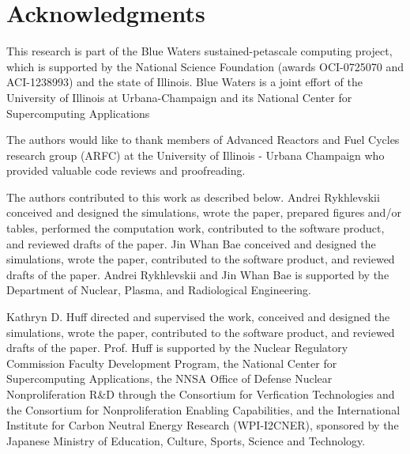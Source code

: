 \section{Acknowledgments}

This research is part of the Blue Waters sustained-petascale computing project, 
which is supported by the National Science Foundation (awards OCI-0725070 and 
ACI-1238993) and the state of Illinois. Blue Waters is a joint effort of the 
University of Illinois at Urbana-Champaign and its National Center for 
Supercomputing Applications 

The authors would like to thank  members of Advanced Reactors and Fuel Cycles
research group (ARFC) at the University of Illinois - Urbana Champaign who 
provided valuable code reviews and proofreading.

The authors contributed to this work as described below.  Andrei Rykhlevskii 
conceived and designed the simulations, wrote the paper, prepared figures 
and/or tables, performed the computation work, contributed to the software 
product, and reviewed drafts of the paper. Jin Whan Bae conceived and designed 
the simulations, wrote the paper, contributed to the software 
product, and reviewed drafts of the paper. Andrei Rykhlevskii and Jin Whan Bae 
is supported by the Department of Nuclear, Plasma, and Radiological Engineering.

Kathryn D. Huff directed and 
supervised the work, conceived and designed the simulations, wrote the paper, 
contributed to the software product, and reviewed drafts of the paper.  Prof. 
Huff is supported by the Nuclear Regulatory Commission Faculty Development 
Program, the National Center for Supercomputing Applications, the NNSA Office 
of Defense Nuclear Nonproliferation R\&D through the Consortium for Verfication 
Technologies and the Consortium for Nonproliferation Enabling Capabilities, and 
the International Institute for Carbon Neutral Energy Research (WPI-I2CNER), 
sponsored by the Japanese Ministry of Education, Culture, Sports, Science and 
Technology.
